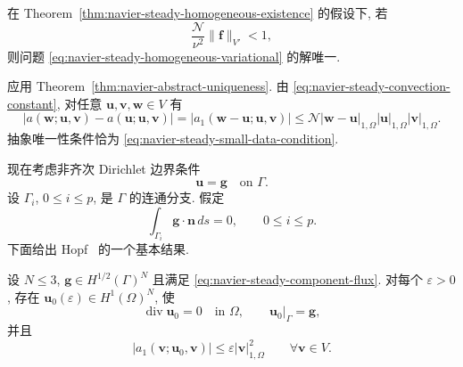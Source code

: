 \setcounter{statement}{1}
\begin{Theorem}\label{thm:navier-steady-homogeneous-uniqueness}
在 Theorem~\ref{thm:navier-steady-homogeneous-existence} 的假设下, 若
\begin{equation}\label{eq:navier-steady-small-data-condition}
\frac{\mathcal N}{\nu^2}\|\mathbf f\|_{V'}<1,
\end{equation}
则问题 \eqref{eq:navier-steady-homogeneous-variational} 的解唯一.
\end{Theorem}
\begin{Proof}
应用 Theorem~\ref{thm:navier-abstract-uniqueness}.
由 \eqref{eq:navier-steady-convection-constant}, 对任意
$\mathbf u,\mathbf v,\mathbf w\in V$ 有
\[
|a(\mathbf w;\mathbf u,\mathbf v)-a(\mathbf u;\mathbf u,\mathbf v)|
=|a_1(\mathbf w-\mathbf u;\mathbf u,\mathbf v)|
\leq\mathcal N|\mathbf w-\mathbf u|_{1,\Omega}
|\mathbf u|_{1,\Omega}|\mathbf v|_{1,\Omega}.
\]
抽象唯一性条件恰为 \eqref{eq:navier-steady-small-data-condition}.
\end{Proof}

现在考虑非齐次 Dirichlet 边界条件
\begin{equation}\label{eq:navier-steady-nonhomogeneous-dirichlet}
\mathbf u=\mathbf g\quad\text{on }\Gamma.
\end{equation}
设 $\Gamma_i$, $0\leq i\leq p$, 是 $\Gamma$ 的连通分支. 假定
\begin{equation}\label{eq:navier-steady-component-flux}
\int_{\Gamma_i}\mathbf g\cdot\mathbf n\,ds=0,
\qquad 0\leq i\leq p.
\end{equation}
下面给出 Hopf~\cite{Hopf1955} 的一个基本结果.

\setcounter{statement}{2}
\begin{Lemma}\label{lem:navier-steady-hopf-lifting}
设 $N\leq3$, $\mathbf g\in H^{1/2}(\Gamma)^N$ 且满足
\eqref{eq:navier-steady-component-flux}. 对每个 $\varepsilon>0$, 存在
$\mathbf u_0(\varepsilon)\in H^1(\Omega)^N$, 使
\begin{equation}\label{eq:navier-steady-hopf-lifting-properties}
\operatorname{div}\mathbf u_0=0\quad\text{in }\Omega,
\qquad
\mathbf u_0|_\Gamma=\mathbf g,
\end{equation}
并且
\begin{equation}\label{eq:navier-steady-hopf-small-convection}
|a_1(\mathbf v;\mathbf u_0,\mathbf v)|
\leq\varepsilon|\mathbf v|_{1,\Omega}^2
\qquad\forall\mathbf v\in V.
\end{equation}
\end{Lemma}

